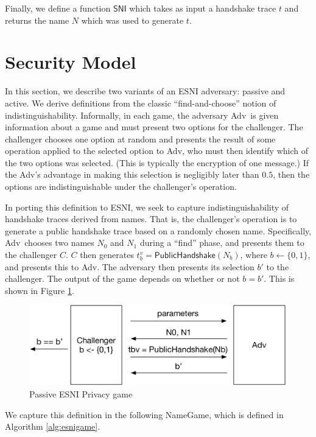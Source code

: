 \documentclass{article}
\newcommand{\adv}{{\sf Adv}}
\theoremstyle{definition}
\begin{document}
Finally, we define a function $\mathsf{SNI}$ which takes as input a handshake trace $t$
and returns the name $N$ which was used to generate $t$. 

\section{Security Model}

In this section, we describe two variants of an ESNI adversary: passive and active. We derive 
definitions from the classic ``find-and-choose'' notion of indistinguishability. Informally, 
in each game, the adversary \adv\ is given information about a game and must present two options
for the challenger. The challenger chooses one option at random and presents the result of some 
operation applied to the selected option to \adv, who must then identify which of 
the two options was selected. (This is typically the encryption of one message.) If the 
\adv's advantage in making this selection is negligibly later than $0.5$, then the options 
are indistinguishable under the challenger's operation.

In porting this definition to ESNI, we seek to capture indistinguishability of handshake traces
derived from names. That is, the challenger's operation is to generate a public handshake trace 
based on a randomly chosen name. Specifically, \adv\ chooses two names $N_0$ and $N_1$ during
a ``find'' phase, and presents them to the challenger $C$. $C$ then generates 
$t_b^v = \mathsf{PublicHandshake}(N_b)$, where $b \gets \{0,1\}$, and presents this to \adv. 
The adversary then presents its selection $b'$ to the challenger. The output of the game
depends on whether or not $b = b'$. This is shown in Figure \ref{fig:passive-game}.

\begin{figure}
    \centering
    \includegraphics[scale=0.7]{esni_game.pdf}
    \caption{Passive ESNI Privacy game}
    \label{fig:passive-game}
\end{figure}

We capture this definition in the following {\sf NameGame}, which is defined in Algorithm \ref{alg:esnigame}.
\end{document}
